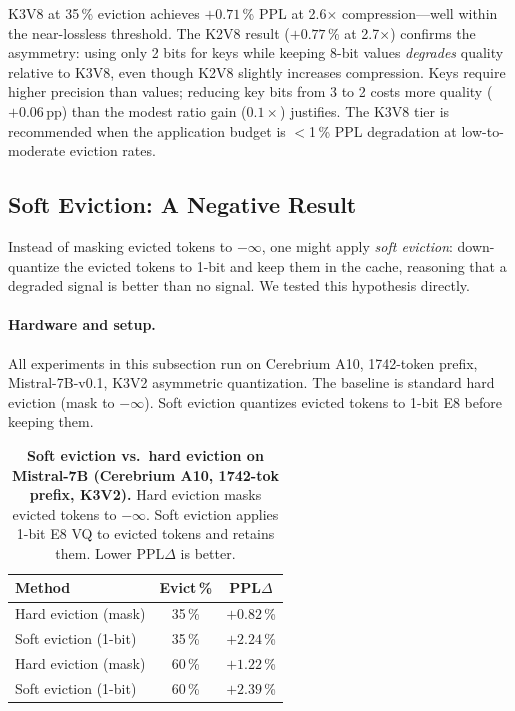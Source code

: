 \documentclass{article}
\begin{document}
K3V8 at 35\,\% eviction achieves $+0.71$\,\% PPL at 2.6$\times$ compression---well
within the near-lossless threshold.  The K2V8 result ($+0.77$\,\% at 2.7$\times$)
confirms the asymmetry: using only 2 bits for keys while keeping 8-bit values
\emph{degrades} quality relative to K3V8, even though K2V8 slightly increases
compression.  Keys require higher precision than values; reducing key bits from
3 to 2 costs more quality ($+0.06$\,pp) than the modest ratio gain ($0.1\times$)
justifies.  The K3V8 tier is recommended when the application budget is
$<$1\,\% PPL degradation at low-to-moderate eviction rates.

\subsection{Soft Eviction: A Negative Result}
\label{sec:soft_eviction}

Instead of masking evicted tokens to $-\infty$, one might apply \emph{soft eviction}:
down-quantize the evicted tokens to 1-bit and keep them in the cache, reasoning
that a degraded signal is better than no signal. We tested this hypothesis directly.

\paragraph{Hardware and setup.}
All experiments in this subsection run on Cerebrium A10, 1742-token prefix,
Mistral-7B-v0.1, K3V2 asymmetric quantization. The baseline is standard hard
eviction (mask to $-\infty$). Soft eviction quantizes evicted tokens to 1-bit
E8 before keeping them.

\begin{table}[h]
\centering
\caption{\textbf{Soft eviction vs.\ hard eviction on Mistral-7B
  (Cerebrium A10, 1742-tok prefix, K3V2).} Hard eviction masks evicted tokens
  to $-\infty$. Soft eviction applies 1-bit E8 VQ to evicted tokens and
  retains them. Lower PPL$\Delta$ is better.}
\label{tab:soft_eviction}
\begin{tabular}{@{}lcc@{}}
\toprule
Method & Evict\,\% & PPL$\Delta$ \\
\midrule
Hard eviction (mask)   & 35\,\% & $+0.82$\,\% \\
Soft eviction (1-bit)  & 35\,\% & $+2.24$\,\% \\
\midrule
Hard eviction (mask)   & 60\,\% & $+1.22$\,\% \\
Soft eviction (1-bit)  & 60\,\% & $+2.39$\,\% \\
\bottomrule
\end{tabular}
\end{table}
\end{document}
